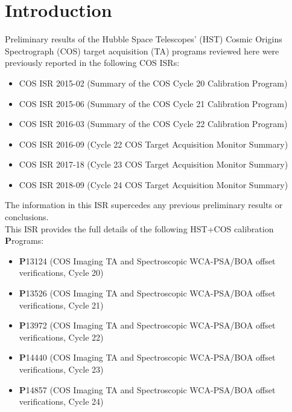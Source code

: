\section{Introduction}\label{sec:Introduction}

Preliminary results of the Hubble Space Telescopes' (HST) Cosmic Origins Spectrograph (COS) target acquisition (TA) programs reviewed here were previously reported in the following COS ISRs:
\small
\begin{itemize}
\item{COS ISR 2015-02 (Summary of the COS Cycle 20 Calibration Program)}
\item{COS ISR 2015-06 (Summary of the COS Cycle 21 Calibration Program)}
\item{COS ISR 2016-03 (Summary of the COS Cycle 22 Calibration Program)}
\item{COS ISR 2016-09 (Cycle 22 COS Target Acquisition Monitor Summary)}
\item{COS ISR 2017-18 (Cycle 23 COS Target Acquisition Monitor Summary)}
\item{COS ISR 2018-09 (Cycle 24 COS Target Acquisition Monitor Summary)}
\end{itemize}
\normalsize
The information in this ISR supercedes any previous preliminary results or conclusions.\\

This ISR provides the full details of the following HST+COS calibration {\bf P}rograms:
\small
\begin{itemize}
\item{{\bf P}13124 (COS Imaging TA and Spectroscopic WCA-PSA/BOA offset verifications, Cycle 20)}
\item{{\bf P}13526 (COS Imaging TA and Spectroscopic WCA-PSA/BOA offset verifications, Cycle 21)}
\item{{\bf P}13972 (COS Imaging TA and Spectroscopic WCA-PSA/BOA offset verifications, Cycle 22)}
\item{{\bf P}14440 (COS Imaging TA and Spectroscopic WCA-PSA/BOA offset verifications, Cycle 23)}
\item{{\bf P}14857 (COS Imaging TA and Spectroscopic WCA-PSA/BOA offset verifications, Cycle 24)}
\end{itemize}
\normalsize

